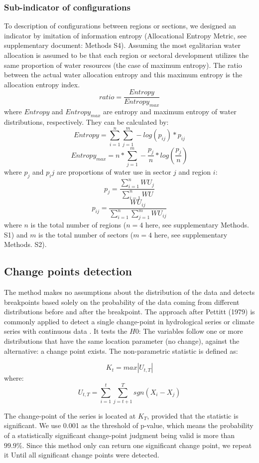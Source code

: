 \documentclass[9pt, twocolumn, twoside, lineno]{pnas-new}
\begin{document}
{	\subsubsection*{Sub-indicator of configurations}
	To description of configurations between regions or sections, we designed an indicator by imitation of information entropy (Allocational Entropy Metric, see supplementary document: Methods S4). Assuming the most egalitarian water allocation is assumed to be that each region or sectoral development utilizes the same proportion of water resources (the case of maximum entropy). The ratio between the actual water allocation entropy and this maximum entropy is the allocation entropy index.
	$$ ratio = \frac{Entropy}{Entropy_{max}} $$
	where $Entropy$ and $Entropy_{max}$ are entropy and maximum entropy of water distributions, respectively. They can be calculated by:
	$$ Entropy = \sum_{i=1}^n \sum_{j=1}^m -log(p_{ij}) * p_{ij} $$
	$$ Entropy_{max} = n * \sum_{j=1}^m -\frac{p_j}{n} * log(\frac{p_j}{n}) $$ 
	where $p_j$ and $p_ij$ are proportions of water use in sector $j$ and region $i$:
	$$ p_j = \frac{\sum_{i=1}^n WU_j}{\sum_{i=1}^n WU} $$
	$$ p_{ij} = \frac{WU_{ij}} {\sum_{i=1}^n \sum_{j=1}^m WU_{ij}} $$
	where $n$ is the total number of regions ($n=4$ here, see supplementary Methods. S1) and $m$ is the total number of sectors ($m=4$ here, see supplementary Methods. S2).

	\subsection*{Change points detection}
		The method makes no assumptions about the distribution of the data and detects breakpoints based solely on the probability of the data coming from different distributions before and after the breakpoint.
		The approach after Pettitt (1979) is commonly applied to detect a single change-point in hydrological series or climate series with continuous data \cite{pettittNonParametricApproachChangePoint1979}. It tests the $H0$: The variables follow one or more distributions that have the same location parameter (no change), against the alternative: a change point exists. The non-parametric statistic is defined as:
	
		$$ K_t = max|U_{t, T}|$$
		where:
		$$ U_{t, T} = \sum_{i=1}^t\sum_{j=t+1}^T sgn(X_i - X_j) $$
	
		The change-point of the series is located at $K_T$, provided that the statistic is significant. We use 0.001 as the threshold of p-value, which means the probability of a statistically significant change-point judgment being valid is more than $99.9\%$. Since this method only can return one significant change point, we repeat it Until all significant change points were detected.
	
}
\end{document}
